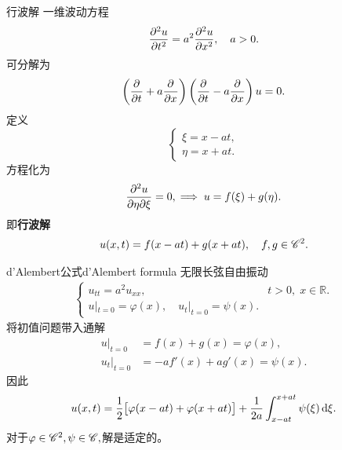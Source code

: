 \begin{example}
	{行波解}{}
	一维波动方程
	\[
		\pv[2]ut=a^2\pv[2]ux,\quad a>0.
	\]
	可分解为
	\[
		\kh{\pp t+a\pp x}\kh{\pp t-a\pp x}u=0.
	\]
	定义
	\[
		\begin{cases}
			\xi=x-at, \\
			\eta=x+at.
		\end{cases}
	\]
	方程化为
	\[
		\pw u\eta\xi=0,\implies u=f(\xi)+g(\eta).
	\]
	即\textbf{行波解}
	\begin{align}
		u(x,t)=f(x-at)+g(x+at),\quad f,g\in\sC^2.
	\end{align}
\end{example}
\begin{theorem}{d'Alembert公式}{d'Alembert formula}
	无限长弦自由振动
	\begin{align*}
		\begin{cases}
			u_{tt}=a^2u_{xx},&t>0,\;x\in\mathbb R. \\
			u|_{t=0}=\varphi(x),\quad u_t|_{t=0}=\psi(x).
		\end{cases}
	\end{align*}
	将初值问题带入通解
	\begin{align*}
		u|_{t=0}   & =f(x)+g(x)=\varphi(x),   \\
		u_t|_{t=0} & =-af'(x)+ag'(x)=\psi(x).
	\end{align*}
	因此
	\begin{align}
		u(x,t)=\frac12\bigfkh{\varphi(x-at)+\varphi(x+at)}+\frac1{2a}\int_{x-at}^{x+at}\psi(\xi)\d\xi.
	\end{align}
	对于$\varphi\in\sC^2,\psi\in\sC,$解是适定的。
\end{theorem}

